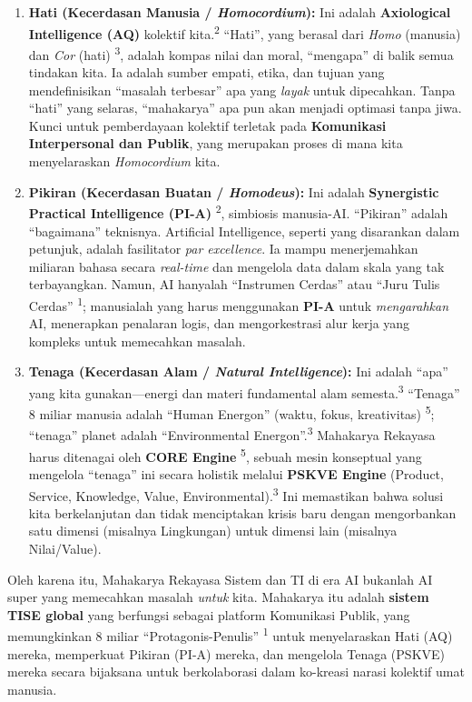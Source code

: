 \documentclass[
  letterpaper,
  DIV=11,
  numbers=noendperiod]{scrreprt}
\begin{document}
\begin{enumerate}
\def\labelenumi{\arabic{enumi}.}
\item
  \textbf{Hati (Kecerdasan Manusia / \emph{Homocordium}):} Ini adalah
  \textbf{Axiological Intelligence (AQ)} kolektif
  kita.\textsuperscript{2} ``Hati'', yang berasal dari \emph{Homo}
  (manusia) dan \emph{Cor} (hati) \textsuperscript{3}, adalah kompas
  nilai dan moral, ``mengapa'' di balik semua tindakan kita. Ia adalah
  sumber empati, etika, dan tujuan yang mendefinisikan ``masalah
  terbesar'' apa yang \emph{layak} untuk dipecahkan. Tanpa ``hati'' yang
  selaras, ``mahakarya'' apa pun akan menjadi optimasi tanpa jiwa. Kunci
  untuk pemberdayaan kolektif terletak pada \textbf{Komunikasi
  Interpersonal dan Publik}, yang merupakan proses di mana kita
  menyelaraskan \emph{Homocordium} kita.
\item
  \textbf{Pikiran (Kecerdasan Buatan / \emph{Homodeus}):} Ini adalah
  \textbf{Synergistic Practical Intelligence (PI-A)}
  \textsuperscript{2}, simbiosis manusia-AI. ``Pikiran'' adalah
  ``bagaimana'' teknisnya. Artificial Intelligence, seperti yang
  disarankan dalam petunjuk, adalah fasilitator \emph{par excellence}.
  Ia mampu menerjemahkan miliaran bahasa secara \emph{real-time} dan
  mengelola data dalam skala yang tak terbayangkan. Namun, AI hanyalah
  ``Instrumen Cerdas'' atau ``Juru Tulis Cerdas'' \textsuperscript{1};
  manusialah yang harus menggunakan \textbf{PI-A} untuk
  \emph{mengarahkan} AI, menerapkan penalaran logis, dan mengorkestrasi
  alur kerja yang kompleks untuk memecahkan masalah.
\item
  \textbf{Tenaga (Kecerdasan Alam / \emph{Natural Intelligence}):} Ini
  adalah ``apa'' yang kita gunakan---energi dan materi fundamental alam
  semesta.\textsuperscript{3} ``Tenaga'' 8 miliar manusia adalah ``Human
  Energon'' (waktu, fokus, kreativitas) \textsuperscript{5}; ``tenaga''
  planet adalah ``Environmental Energon''.\textsuperscript{3} Mahakarya
  Rekayasa harus ditenagai oleh \textbf{CORE Engine}
  \textsuperscript{5}, sebuah mesin konseptual yang mengelola ``tenaga''
  ini secara holistik melalui \textbf{PSKVE Engine} (Product, Service,
  Knowledge, Value, Environmental).\textsuperscript{3} Ini memastikan
  bahwa solusi kita berkelanjutan dan tidak menciptakan krisis baru
  dengan mengorbankan satu dimensi (misalnya Lingkungan) untuk dimensi
  lain (misalnya Nilai/Value).
\end{enumerate}

Oleh karena itu, Mahakarya Rekayasa Sistem dan TI di era AI bukanlah AI
super yang memecahkan masalah \emph{untuk} kita. Mahakarya itu adalah
\textbf{sistem TISE global} yang berfungsi sebagai platform Komunikasi
Publik, yang memungkinkan 8 miliar ``Protagonis-Penulis''
\textsuperscript{1} untuk menyelaraskan Hati (AQ) mereka, memperkuat
Pikiran (PI-A) mereka, dan mengelola Tenaga (PSKVE) mereka secara
bijaksana untuk berkolaborasi dalam ko-kreasi narasi kolektif umat
manusia.
\end{document}
